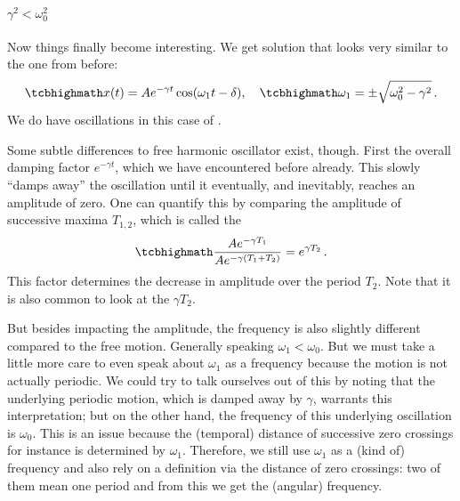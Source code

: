 \documentclass[../class_mech_main.tex]{subfiles}
\begin{document}



			\paragraph{$\gamma^2 < \omega_0^2$}
Now things finally become interesting. We get solution that looks very similar to the one from before:
\begin{equation}
	\eqbox{
		x(t) = A e^{- \gamma t} \cos(\omega_1 t - \delta)
	}, \quad
	\eqbox{
		\omega_1 = \pm \sqrt{\omega_0^2 - \gamma^2}
	} \, .
\end{equation}
We do have oscillations in this case of .

Some subtle differences to free harmonic oscillator exist, though. First the overall damping factor $e^{- \gamma t}$, which we have encountered before already. This slowly \enquote{damps away} the oscillation until it eventually, and inevitably, reaches an amplitude of zero. One can quantify this by comparing the amplitude of successive maxima $T_{1, 2}$, which is called the 
\begin{equation}
	\eqbox{
		\frac{A e^{- \gamma T_1}}{A e^{- \gamma (T_1 + T_2)}} = e^{\gamma T_2}
	} \, .
\end{equation}
This factor determines the decrease in amplitude over the period $T_2$. Note that it is also common to look at the  $\gamma T_2$.

But besides impacting the amplitude, the frequency is also slightly different compared to the free motion. Generally speaking $\omega_1 < \omega_0$. But we must take a little more care to even speak about $\omega_1$ as a frequency because the motion is not actually periodic. We could try to talk ourselves out of this by noting that the underlying periodic motion, which is damped away by $\gamma$, warrants this interpretation; but on the other hand, the frequency of this underlying oscillation is $\omega_0$. This is an issue because the (temporal) distance of successive zero crossings for instance is determined by $\omega_1$. Therefore, we still use $\omega_1$ as a (kind of) frequency and also rely on a definition via the distance of zero crossings: two of them mean one period and from this we get the (angular) frequency.


\end{document}
